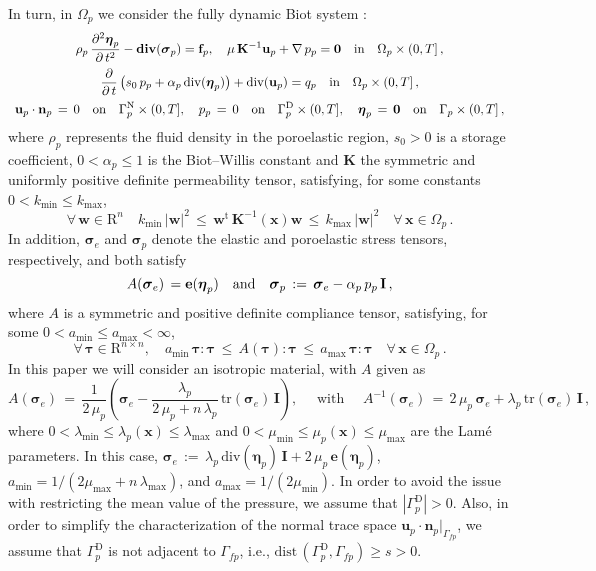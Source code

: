 \documentclass[11pt]{article}
\numberwithin{equation}{section}
\newcommand{\ds}{\displaystyle}
\newcommand{\bbeta}{{\boldsymbol\eta}}
\newcommand{\bsi}{{\boldsymbol\sigma}}
\newcommand{\btau}{{\boldsymbol\tau}}
\newcommand{\bw}{{\mathbf{w}}}
\newcommand{\f}{\mathbf{f}}
\newcommand{\bu}{\mathbf{u}}
\newcommand{\bn}{{\mathbf{n}}}
\newcommand{\be}{{\mathbf{e}}}
\newcommand{\0}{{\mathbf{0}}}
\def\bK{\mathbf{K}}
\def\bI{\mathbf{I}}
\def\bx{\mathbf{x}}
\def\R{\mathrm{R}}
\def\rD{\mathrm{D}}
\def\rN{\mathrm{N}}
\def\rt{\mathrm{t}}
\def\bdiv{\mathbf{div}}
\def\tr{\mathrm{tr}}
\def\div{\mathrm{div}}
\def\dist{\mathrm{dist}\,}
\def\qin{{\quad\hbox{in}\quad}}
\def\qon{{\quad\hbox{on}\quad}}
\def\qan{{\quad\hbox{and}\quad}}
\numberwithin{equation}{section}
\begin{document}
In turn, in $\Omega_p$ we consider the fully dynamic Biot system \cite{b1941}:
\begin{equation}\label{eq:Biot-model}
\begin{array}{c}
\ds \rho_p\,\frac{\partial^2\bbeta_p}{\partial\,t^2} - \bdiv(\bsi_p) = \f_p,\quad 
\mu\,\bK^{-1}\bu_p + \nabla\,p_p = \0 \qin \Omega_p\times(0,T] \,, \\[2ex]
\ds \frac{\partial}{\partial\,t}\left( s_0\,p_p + \alpha_p\,\div(\bbeta_p) \right) + \div(\bu_p) = q_p \qin \Omega_p\times(0,T] \,, \\[2ex]
\ds \bu_p\cdot\bn_p \,=\, 0 \qon \Gamma^\rN_p\times (0,T],\quad 
p_p \,=\, 0 \qon \Gamma^\rD_p\times (0,T],\quad
\bbeta_p \,=\, \0 \qon \Gamma_p\times (0,T]\,,
\end{array}
\end{equation}
where $\rho_p$ represents the fluid density in the poroelastic region, 
$s_0 > 0$ is a storage coefficient, $0 < \alpha_p \leq 1$ is the Biot--Willis constant and $\bK$ the symmetric and uniformly positive definite permeability tensor, satisfying, for some constants $0< k_{\min}\leq k_{\max}$,
\begin{equation}\label{eq:permeability-bounds}
\forall\, \bw\in\R^n \quad k_{\min}\,|\bw|^2 \,\leq\, \bw^\rt\,\bK^{-1}(\bx)\bw \,\leq\, k_{\max}\,|\bw|^2 \quad \forall\, \bx\in\Omega_p \,.
\end{equation}
In addition, $\bsi_e$ and $\bsi_p$ denote the elastic and poroelastic stress tensors, respectively, and both satisfy
\begin{equation}\label{eq:bsie-bsip-definitions}
A(\bsi_e) \,= \be(\bbeta_p)  \qan
\bsi_p \,:=\, \bsi_e - \alpha_p\,p_p\,\bI \,,
\end{equation}
%
where $A$ is a symmetric and positive definite compliance tensor,
satisfying, for some $0 < a_{\min} \leq a_{\max} < \infty$,
%
\begin{equation}\label{eq:A-bounds}
\forall\, \btau\in\R^{n\times n}, \quad a_{\min}
\, \btau : \btau \, \leq \, A(\btau):\btau \, \leq \, a_{\max} \,
\btau : \btau \quad \forall\, \bx\in\Omega_p \,.
\end{equation}
%
In this paper we will consider an isotropic material, with $A$ given as
%
\begin{equation}\label{eq:elasticity-stress-isotropic}
A(\bsi_e) \,=\, \frac{1}{2\,\mu_p} \left(\bsi_e - \frac{\lambda_p}{2\,\mu_p + n\,\lambda_p}\,\tr(\bsi_e)\,\bI\right),\quad\mbox{ with }\quad 
A^{-1}(\bsi_e) \,=\, 2\,\mu_p\,\bsi_e + \lambda_p\,\tr(\bsi_e)\,\bI \,,
\end{equation}
%
where $\ds 0<\lambda_{\min}\leq \lambda_p(\bx)\leq \lambda_{\max}$ and 
$\ds 0<\mu_{\min} \leq\mu_p(\bx) \leq\mu_{\max}$ are the Lam\'e parameters.
In this case, 
$\bsi_e \,:=\, \lambda_p\,\div(\bbeta_p)\,\bI + 2\,\mu_p\,\be(\bbeta_p)$,  $\ds a_{\min}=1/(2 \mu_{\max} + n \, \lambda_{\max})$, and 
$\ds a_{\max}=1/(2 \mu_{\min})$.
%
In order to avoid the issue with restricting the mean value of the pressure, we assume that $|\Gamma^\rD_p| > 0$. Also, in order to simplify the characterization of the normal trace space $\bu_p\cdot\bn_p|_{\Gamma_{fp}}$, we assume that $\Gamma^\rD_p$ is not adjacent to $\Gamma_{fp}$, i.e., $\dist(\Gamma^\rD_p,\Gamma_{fp}) \geq s >0$.
\end{document}

